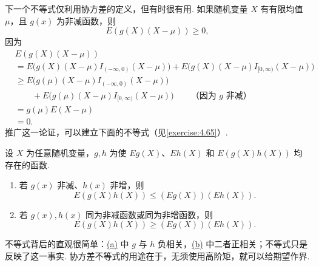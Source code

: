下一个不等式仅利用协方差的定义，但有时很有用. 如果随机变量 $X$ 有有限均值 $\mu$，且 $g(x)$ 为非减函数，则
$$E(g(X)(X-\mu))\ge0,$$
因为
$$\begin{aligned}
&E(g(X)(X-\mu))\\
&=E\bigl(g(X)(X-\mu)I_{(-\infty,0)}(X-\mu)\bigr)+E\bigl(g(X)(X-\mu)I_{[0,\infty)}(X-\mu)\bigr)\\
&\ge E\bigl(g(\mu)(X-\mu)I_{(-\infty,0)}(X-\mu)\bigr)\\
&\qquad+E\bigl(g(\mu)(X-\mu)I_{[0,\infty)}(X-\mu)\bigr)\qquad\text{（因为 $g$ 非减）}\\
&=g(\mu)E(X-\mu)\\
&=0.
\end{aligned}$$
推广这一论证，可以建立下面的不等式（见\autoref{exercise:4.65}）.
\begin{theorem}[协方差不等式]\label{thm:4.7.9}
设 $X$ 为任意随机变量，$g,h$ 为使 $Eg(X)$、$Eh(X)$ 和 $E(g(X)h(X))$ 均存在的函数.
\begin{enumerate}
\item[(a)]\label{itm:thm:4.7.9:a} 若 $g(x)$ 非减、$h(x)$ 非增，则
$$E(g(X)h(X))\le(Eg(X))(Eh(X)).$$
\item[(b)]\label{itm:thm:4.7.9:b} 若 $g(x),h(x)$ 同为非减函数或同为非增函数，则
$$E(g(X)h(X))\ge(Eg(X))(Eh(X)).$$
\end{enumerate}
\end{theorem}
不等式背后的直观很简单：\hyperref[itm:thm:4.7.9:a]{(a)} 中 $g$ 与 $h$ 负相关，\hyperref[itm:thm:4.7.9:b]{(b)} 中二者正相关；不等式只是反映了这一事实. 协方差不等式的用途在于，无须使用高阶矩，就可以给期望作界.
